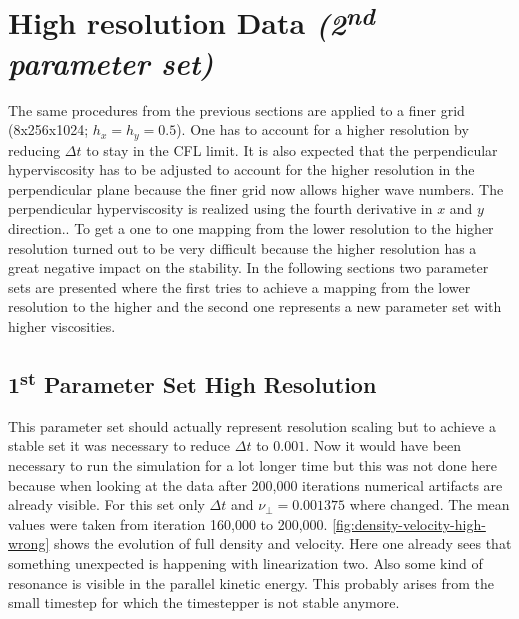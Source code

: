\documentclass[master.tex]{subfiles}
\begin{document}
\section{High resolution Data \textit{(2\textsuperscript{nd} parameter set)}}
The same procedures from the previous sections are applied to a finer grid (8x256x1024; $h_x = h_y = 0.5$). One has to account for a higher resolution by reducing $\Delta t$ to stay in the \ac{CFL} limit. It is also expected that the perpendicular hyperviscosity has to be adjusted to account for the higher resolution in the perpendicular plane because the finer grid now allows higher wave numbers. \newline
{}The perpendicular hyperviscosity is realized using the fourth derivative in $x$ and $y$ direction.. \newline
To get a one to one mapping from the lower resolution to the higher resolution turned out to be very difficult because the higher resolution has a great negative impact on the stability. In the following sections two parameter sets are presented where the first tries to achieve a mapping from the lower resolution to the higher and the second one represents a new parameter set with higher viscosities.

\subsection{1\textsuperscript{st} Parameter Set High Resolution}
This parameter set should actually represent resolution scaling but to achieve a stable set it was necessary to reduce $\Delta t$ to $0.001$. Now it would have been necessary to run the simulation for a lot longer time but this was not done here because when looking at the data after 200,000 iterations numerical artifacts are already visible.\newline
For this set only $\Delta t$ and $\nu_\perp = 0.001375$ where changed.\newline
The mean values were taken from iteration 160,000 to 200,000.
\autoref{fig:density-velocity-high-wrong} shows the evolution of full density and velocity. Here one already sees that something unexpected is happening with linearization two. Also some kind of resonance is visible in the parallel kinetic energy. This probably arises from the small timestep for which the timestepper is not stable anymore.
\end{document}
